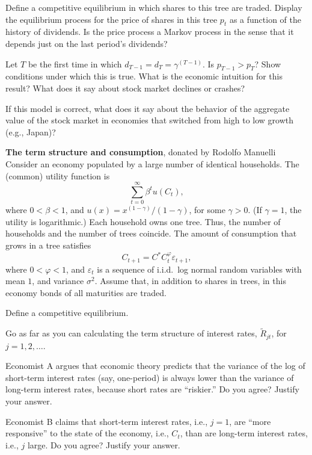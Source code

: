  Define a competitive equilibrium in which shares to this tree are traded.
\medskip
  Display the equilibrium process for the price of
shares in this tree ${p_t}$ as a function of the history of
dividends.  Is the price process a Markov process in the sense
that it depends just on the last period's dividends?
\medskip

 Let $T$ be the first time in which $d_{T-1}=d_T=\gamma^{(T-1)}$.
Is $p_{T-1}>p_T$?  Show conditions under which this is true.  What
is the economic intuition for this result?  What does it say about
stock market declines or crashes?
\medskip

 If this model is correct, what does it say about the behavior
of the aggregate value of the stock market in economies that switched
from high to low growth (e.g., Japan)?
\medskip

 \quad
  {\bf The term structure and consumption}, donated
by Rodolfo Manuelli
\medskip\noindent
Consider an economy populated by a large number of identical households.
The (common) utility function is
$$ \sum_{t=0}^\infty \beta^t u(C_t), $$
where $0<\beta<1$, and $u(x)=x^{(1-\gamma)}/(1-\gamma)$, for some
 $\gamma > 0$.  (If $\gamma = 1$, the utility is logarithmic.)
Each household owns one tree.  Thus, the number of households and the number
of trees
coincide.  The amount of consumption that grows in a tree satisfies
$$ C_{t+1} = C^* C_t^\varphi \varepsilon_{t+1}, $$
where $0<\varphi<1$, and $\varepsilon_t$ is a sequence of i.i.d.\ log
normal random variables with mean $1$, and variance $\sigma^2$.  Assume
that, in addition to shares in trees, in this economy bonds of all
maturities are traded.
\medskip

 Define a competitive equilibrium.
\medskip

 Go as far as you can calculating the term structure of interest rates,
$\tilde R_{jt}$, for $j = 1, 2, \ldots$.
\medskip

 Economist A argues that economic theory predicts that the variance
of the log of short-term interest rates (say, one-period) is always
lower than the variance of long-term interest rates, because short
rates are ``riskier.'' Do you agree?  Justify your answer.
\medskip

 Economist B claims that short-term interest rates, i.e., $j = 1$,
are ``more responsive'' to the state of the economy, i.e., $C_t$, than
are long-term interest rates, i.e., $j$ large.  Do you agree?  Justify
your answer.
\medskip

